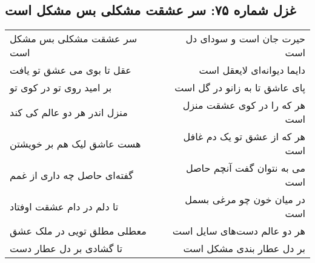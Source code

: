 \begin{center}
\section*{غزل شماره ۷۵: سر عشقت مشکلی بس مشکل است}
\label{sec:075}
\begin{longtable}{l p{0.5cm} r}
سر عشقت مشکلی بس مشکل است
&&
حیرت جان است و سودای دل است
\\
عقل تا بوی می عشق تو یافت
&&
دایما دیوانه‌ای لایعقل است
\\
بر امید روی تو در کوی تو
&&
پای عاشق تا به زانو در گل است
\\
منزل اندر هر دو عالم کی کند
&&
هر که را در کوی عشقت منزل است
\\
هست عاشق لیک هم بر خویشتن
&&
هر که از عشق تو یک دم غافل است
\\
گفته‌ای حاصل چه داری از غمم
&&
می به نتوان گفت آنچم حاصل است
\\
تا دلم در دام عشقت اوفتاد
&&
در میان خون چو مرغی بسمل است
\\
معطلی مطلق تویی در ملک عشق
&&
هر دو عالم دست‌های سایل است
\\
تا گشادی بر دل عطار دست
&&
بر دل عطار بندی مشکل است
\\
\end{longtable}
\end{center}

